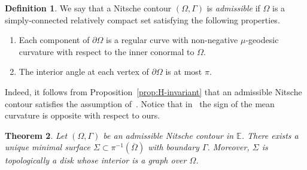 \documentclass[a4paper,10pt,reqno]{amsart}
\newcommand{\E}{\mathbb{E}}
\newtheorem{theorem}{Theorem}[section]
\theoremstyle{definition}
\newtheorem{definition}[theorem]{Definition}
\theoremstyle{remark}
\numberwithin{equation}{section}
\begin{document}
\begin{definition}
We say that a Nitsche contour $(\Omega,\Gamma)$ is  \emph{admissible} if $\Omega$ is a simply-connected relatively compact set satisfying the following properties.
\begin{enumerate}[label=(\alph*)]
	\item Each component of $\partial\Omega$ is a regular curve with non-negative $\mu$-geodesic curvature with respect to the inner conormal to $\Omega$.
	\item The interior angle at each vertex of $\partial\Omega$  is at most $\pi$.
\end{enumerate}
\end{definition}

Indeed, it follows from Proposition~\ref{prop:H-invariant} that an admissible Nitsche contour satisfies the assumption of~\cite[Thm.~1]{MY1}. Notice that in~\cite{MY1} the sign of the mean curvature is opposite with respect to ours.

\begin{theorem}\label{thm:existence}
Let $(\Omega,\Gamma)$ be an admissible Nitsche contour in $\E$. There exists a unique minimal surface $\Sigma\subset\pi^{-1}(\overline\Omega)$ with boundary $\Gamma$. Moreover, $\Sigma$ is topologically a disk whose interior is a graph over $\Omega$.
\end{theorem}
	
\end{document}
